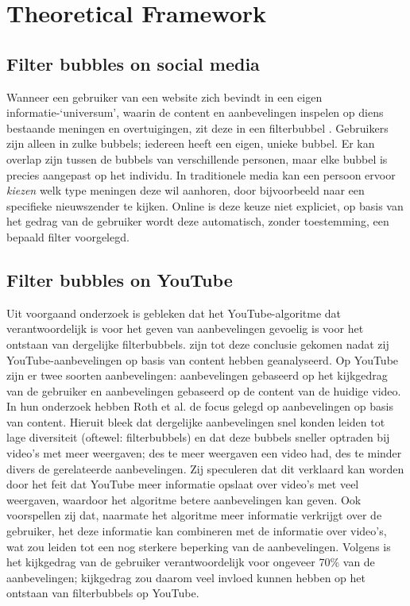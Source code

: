 \documentclass[../main.tex]{subfiles}
\begin{document}
\section{Theoretical Framework}
\subsection{Filter bubbles on social media}
Wanneer een gebruiker van een website zich bevindt in een eigen informatie-‘universum’, waarin de content en aanbevelingen inspelen op diens bestaande meningen en overtuigingen, zit deze in een filterbubbel \citep{pariser2011filter}. Gebruikers zijn alleen in zulke bubbels; iedereen heeft een eigen, unieke bubbel. Er kan overlap zijn tussen de bubbels van verschillende personen, maar elke bubbel is precies aangepast op het individu. In traditionele media kan een persoon ervoor \textit{kiezen} welk type meningen deze wil aanhoren, door bijvoorbeeld naar een specifieke nieuwszender te kijken. Online is deze keuze niet expliciet, op basis van het gedrag van de gebruiker wordt deze automatisch, zonder toestemming, een bepaald filter voorgelegd. 

\subsection{Filter bubbles on YouTube}
Uit voorgaand onderzoek is gebleken dat het YouTube-algoritme dat verantwoordelijk is voor het geven van aanbevelingen gevoelig is voor het ontstaan van dergelijke filterbubbels. \citet{roth2020tubes} zijn tot deze conclusie gekomen nadat zij YouTube-aanbevelingen op basis van content hebben geanalyseerd. Op YouTube zijn er twee soorten aanbevelingen: aanbevelingen gebaseerd op het kijkgedrag van de gebruiker en aanbevelingen gebaseerd op de content van de huidige video. In hun onderzoek hebben Roth et al. de focus gelegd op aanbevelingen op basis van content. Hieruit bleek dat dergelijke aanbevelingen snel konden leiden tot lage diversiteit (oftewel: filterbubbels) en dat deze bubbels sneller optraden bij video’s met meer weergaven; des te meer weergaven een video had, des te minder divers de gerelateerde aanbevelingen. Zij speculeren dat dit verklaard kan worden door het feit dat YouTube meer informatie opslaat over video’s met veel weergaven, waardoor het algoritme betere aanbevelingen kan geven. Ook voorspellen zij dat, naarmate het algoritme meer informatie verkrijgt over de gebruiker, het deze informatie kan combineren met de informatie over video’s, wat zou leiden tot een nog sterkere beperking van de aanbevelingen. Volgens \citet{ledwich2019algorithmic} is het kijkgedrag van de gebruiker verantwoordelijk voor ongeveer 70\% van de aanbevelingen; kijkgedrag zou daarom veel invloed kunnen hebben op het ontstaan van filterbubbels op YouTube.  
\end{document}
